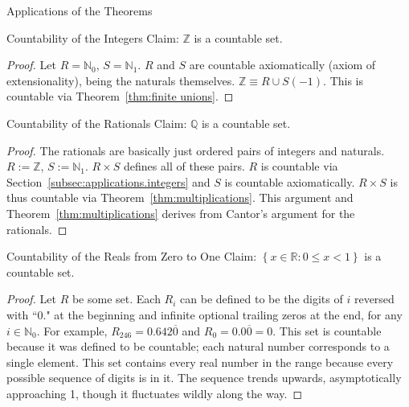 \documentclass[12pt]{article}
\begin{document}
\pagebreak\begin{section}{Applications of the Theorems}\label{sec:applications}
	\begin{subsection}{Countability of the Integers}\label{subsec:applications.integers}
		Claim: $\mathbb Z$ is a countable set.
		\begin{proof}
			Let $R=\mathbb N_0$, $S=\mathbb N_1$. $R$ and $S$ are countable axiomatically
			(axiom of extensionality), being the naturals themselves. $\mathbb Z\equiv R
			\cup S(-1)$. This is countable via Theorem~\ref{thm:finite unions}.
		\end{proof}
	\end{subsection}

	\vspace{-1em}\begin{subsection}{Countability of the Rationals}\label{subsec:applications.rationals}
		Claim: $\mathbb Q$ is a countable set.
		\begin{proof}
			The rationals are basically just ordered pairs of integers and naturals.
			$R:=\mathbb Z$, $S:=\mathbb N_1$. $R\times S$ defines all of these pairs.
			$R$ is countable via Section~\ref{subsec:applications.integers} and $S$ is
			countable axiomatically. $R\times S$ is thus countable via Theorem~\ref{thm:multiplications}.
			This argument and Theorem~\ref{thm:multiplications} derives from Cantor's argument for the rationals.
		\end{proof}
	\end{subsection}

	\vspace{-1em}\begin{subsection}{Countability of the Reals from Zero to One}\label{subsec:applications.reals 0 to 1}
		Claim: $\left\{x\in\mathbb R:0\leqslant x<1\right\}$ is a countable set.
		\begin{proof}
			Let $R$ be some set. Each $R_i$ can be defined to be the digits of $i$ reversed
			with ``0." at the beginning and infinite optional trailing zeros at the end, for
			any $i\in\mathbb N_0$. For example, $R_{246}=0.642\overline0$ and
			$R_0=0.0\overline0=0$. This set is countable because it was defined to be countable;
			each natural number corresponds to a single element. This set contains every real
			number in the range because every possible sequence of digits is in it. The sequence
			trends upwards, asymptotically approaching 1, though it fluctuates wildly along the way.
		\end{proof}
	\end{subsection}


\end{section}
\end{document}
